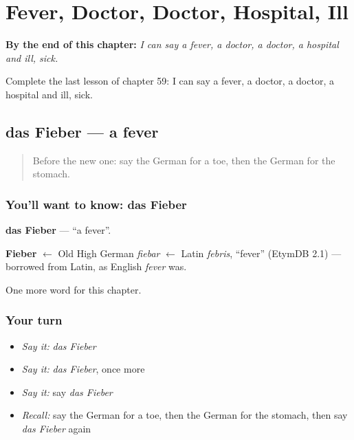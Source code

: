 
\chapter{Fever, Doctor, Doctor, Hospital, Ill}
\label{ch:ge-fever-doctor-doctor-hospital-ill}

\begin{chapteropening}
\textbf{By the end of this chapter:} \emph{I can say a fever, a doctor, a doctor, a hospital and ill, sick.}

Complete the last lesson of chapter 59: I can say a fever, a doctor, a doctor, a hospital and ill, sick.
\end{chapteropening}

\section[das Fieber]{das Fieber — a fever}

\label{lesson:GE-C59-fieber}



\begin{quote}
Before the new one: say the German for a toe, then the German for the stomach.
\end{quote}

\subsection*{You'll want to know: das Fieber}
\textbf{das Fieber} — \textquotedblleft{}a fever\textquotedblright{}.

\begin{cousinweb}
\textbf{Fieber} $\leftarrow$ Old High German \emph{fiebar} $\leftarrow$ Latin \emph{febris}, \textquotedblleft{}fever\textquotedblright{} (EtymDB 2.1) — borrowed from Latin, as English \emph{fever} was.
\end{cousinweb}

\begin{grammarlens}[title={What you've built}]
One more word for this chapter.
\end{grammarlens}

\subsection*{Your turn}
\begin{itemize}
\raggedright
  \item \emph{Say it:} \emph{das Fieber}
  \item \emph{Say it:} \emph{das Fieber}, once more
  \item \emph{Say it:} say \emph{das Fieber}
  \item \emph{Recall:} say the German for a toe, then the German for the stomach, then say \emph{das Fieber} again
\end{itemize}

